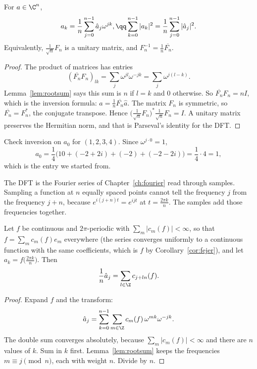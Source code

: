\begin{theorem}\label{thm:dftinversion}
For $a\in\C^n$,
\[
\begin{gathered}a_k=\frac1n\sum_{j=0}^{n-1}\hat a_j\omega^{jk},\qq\sum_{k=0}^{n-1}|a_k|^2=\frac1n\sum_{j=0}^{n-1}|\hat a_j|^2.\end{gathered}
\]
Equivalently, $\frac1{\sqrt n}F_n$ is a unitary matrix, and $F_n^{-1}=\frac1n\overline{F_n}$.
\end{theorem}
\begin{proof}
The product of matrices has entries
\[
(\overline{F_n}F_n)_{lk}=\sum_j\omega^{jl}\omega^{-jk}=\sum_j\omega^{j(l-k)}.
\]
Lemma~\ref{lem:rootsum} says this sum is $n$ if $l=k$ and $0$ otherwise. So $\overline{F_n}F_n=nI$, which is the inversion formula: $a=\frac1n\overline{F_n}\hat a$. The matrix $F_n$ is symmetric, so $\overline{F_n}=F_n^*$, the conjugate transpose. Hence $\bigl(\frac1{\sqrt n}F_n\bigr)^*\frac1{\sqrt n}F_n=I$. A unitary matrix preserves the Hermitian norm, and that is Parseval's identity for the DFT.
\end{proof}

Check inversion on $a_0$ for $(1,2,3,4)$. Since $\omega^{j\cdot0}=1$,
\[
a_0=\frac14\bigl(10+(-2+2i)+(-2)+(-2-2i)\bigr)=\frac14\cdot4=1,
\]
which is the entry we started from.

The DFT is the Fourier series of Chapter~\ref{ch:fourier} read through samples. Sampling a function at $n$ equally spaced points cannot tell the frequency $j$ from the frequency $j+n$, because $e^{i(j+n)t}=e^{ijt}$ at $t=\frac{2\pi k}n$. The samples add those frequencies together.

\begin{proposition}[aliasing]\label{prop:aliasing}
Let $f$ be continuous and $2\pi$-periodic with $\sum_m|c_m(f)|<\infty$, so that $f=\sum_mc_m(f)e_m$ everywhere (the series converges uniformly to a continuous function with the same coefficients, which is $f$ by Corollary~\ref{cor:fejer}), and let $a_k=f\bigl(\frac{2\pi k}n\bigr)$. Then
\[
\frac1n\hat a_j=\sum_{l\in\Z}c_{j+ln}(f).
\]
\end{proposition}
\begin{proof}
Expand $f$ and the transform:
\[
\hat a_j=\sum_{k=0}^{n-1}\sum_{m\in\Z}c_m(f)\,\omega^{mk}\omega^{-jk}.
\]
The double sum converges absolutely, because $\sum_m|c_m(f)|<\infty$ and there are $n$ values of $k$. Sum in $k$ first. Lemma~\ref{lem:rootsum} keeps the frequencies $m\equiv j\pmod n$, each with weight $n$. Divide by $n$.
\end{proof}

